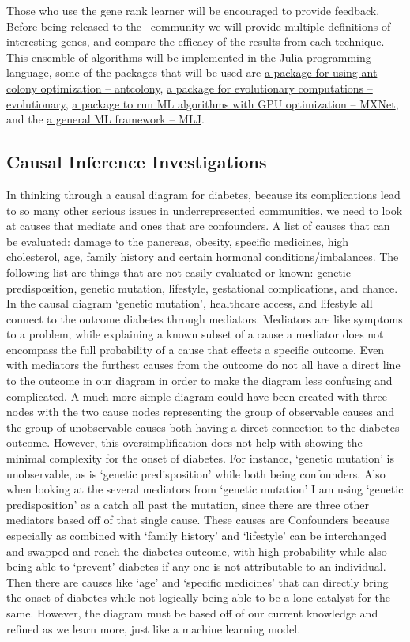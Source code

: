 Those who use the gene rank learner will be encouraged to provide feedback.
Before being released to the \GN\ community we will provide multiple definitions of interesting genes, and compare the efficacy of the results from each technique.
This ensemble of algorithms will be implemented in the Julia programming language, some of the packages that will be used are \hyperlink{https://www.juliapackages.com/p/antcolony}{a package for using ant colony optimization -- antcolony}, \hyperlink{https://juliapackages.com/p/evolutionary}{a package for evolutionary computations -- evolutionary}, \hyperlink{https://juliapackages.com/p/mxnet}{a package to run ML algorithms with GPU optimization -- MXNet}, and the \hyperlink{https://alan-turing-institute.github.io/MLJ.jl/dev/}{a general ML framework -- MLJ}.


\subsection{Causal Inference Investigations}
In thinking through a causal diagram for diabetes, because its complications lead to so many other serious issues in underrepresented communities, we need to look at causes that mediate and ones that are confounders.
A list of causes that can be evaluated: damage to the pancreas, obesity, specific medicines, high cholesterol, age, family history and certain hormonal conditions/imbalances.
The following list are things that are not easily evaluated or known: genetic predisposition, genetic mutation, lifestyle, gestational complications, and chance.
In the causal diagram `genetic mutation', healthcare access, and lifestyle all connect to the outcome diabetes through mediators.
Mediators are like symptoms to a problem, while explaining a known subset of a cause a mediator does not encompass the full probability of a cause that effects a specific outcome.
Even with mediators the furthest causes from the outcome do not all have a direct line to the outcome in our diagram in order to make the diagram less confusing and complicated.
A much more simple diagram could have been created with three nodes with the two cause nodes representing the group of observable causes and the group of unobservable causes both having a direct connection to the diabetes outcome.
However, this oversimplification does not help with showing the minimal complexity for the onset of diabetes.
For instance, `genetic mutation' is unobservable, as is `genetic predisposition' while both being confounders.
Also when looking at the several mediators from `genetic mutation' I am using `genetic predisposition' as a catch all past the mutation, since there are three other mediators based off of that single cause.
These causes are Confounders because especially as combined with `family history' and `lifestyle' can be interchanged and swapped and reach the diabetes outcome, with high probability while also being able to `prevent' diabetes if any one is not attributable to an individual.
Then there are causes like `age' and `specific medicines' that can directly bring the onset of diabetes while not logically being able to be a lone catalyst for the same.
However, the diagram must be based off of our current knowledge and refined as we learn more, just like a machine learning model.

